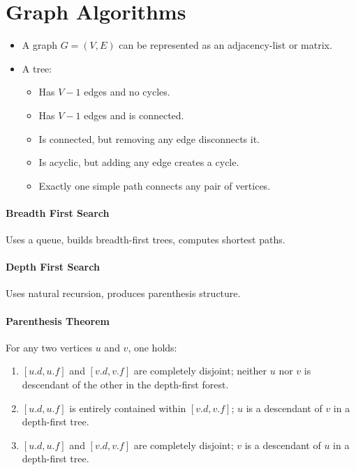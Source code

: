 \documentclass[twocolumn,english]{article}
\numberwithin{equation}{section}
\numberwithin{figure}{section}
\numberwithin{table}{section}
\begin{document}
\section{Graph Algorithms}
\begin{itemize}
\item A graph $G=\left(V,E\right)$ can be represented as an adjacency-list
or matrix.
\item A tree:
\begin{itemize}
\item Has $V-1$ edges and no cycles.
\item Has $V-1$ edges and is connected.
\item Is connected, but removing any edge disconnects it.
\item Is acyclic, but adding any edge creates a cycle.
\item Exactly one simple path connects any pair of vertices.
\end{itemize}
\end{itemize}

\paragraph{Breadth First Search}

Uses a queue, builds breadth-first trees, computes shortest paths.

\paragraph{Depth First Search}

Uses natural recursion, produces parenthesis structure.

\paragraph{Parenthesis Theorem}

For any two vertices $u$ and $v$, one holds:
\begin{enumerate}
\item $\left[u.d,u.f\right]$ and $\left[v.d,v.f\right]$ are completely
disjoint; neither $u$ nor $v$ is descendant of the other in the
depth-first forest.
\item $\left[u.d,u.f\right]$ is entirely contained within $\left[v.d,v.f\right]$;
$u$ is a descendant of $v$ in a depth-first tree.
\item $\left[u.d,u.f\right]$ and $\left[v.d,v.f\right]$ are completely
disjoint; $v$ is a descendant of $u$ in a depth-first tree.
\end{enumerate}
\end{document}
